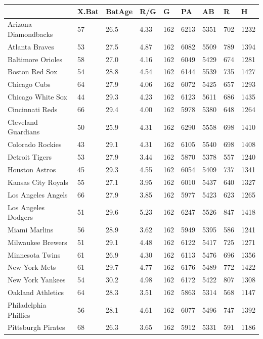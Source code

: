 \documentclass[
  11pt,
]{book}
\theoremstyle{definition}
\theoremstyle{definition}
\theoremstyle{definition}
\theoremstyle{definition}
\theoremstyle{remark}
\begin{document}
\begin{tabular}{lllllllll}
\toprule
  & X.Bat & BatAge & R/G & G & PA & AB & R & H\\
\midrule
Arizona Diamondbacks & 57 & 26.5 & 4.33 & 162 & 6213 & 5351 & 702 & 1232\\
Atlanta Braves & 53 & 27.5 & 4.87 & 162 & 6082 & 5509 & 789 & 1394\\
Baltimore Orioles & 58 & 27.0 & 4.16 & 162 & 6049 & 5429 & 674 & 1281\\
Boston Red Sox & 54 & 28.8 & 4.54 & 162 & 6144 & 5539 & 735 & 1427\\
Chicago Cubs & 64 & 27.9 & 4.06 & 162 & 6072 & 5425 & 657 & 1293\\
\addlinespace
Chicago White Sox & 44 & 29.3 & 4.23 & 162 & 6123 & 5611 & 686 & 1435\\
Cincinnati Reds & 66 & 29.4 & 4.00 & 162 & 5978 & 5380 & 648 & 1264\\
Cleveland Guardians & 50 & 25.9 & 4.31 & 162 & 6290 & 5558 & 698 & 1410\\
Colorado Rockies & 43 & 29.1 & 4.31 & 162 & 6105 & 5540 & 698 & 1408\\
Detroit Tigers & 53 & 27.9 & 3.44 & 162 & 5870 & 5378 & 557 & 1240\\
\addlinespace
Houston Astros & 45 & 29.3 & 4.55 & 162 & 6054 & 5409 & 737 & 1341\\
Kansas City Royals & 55 & 27.1 & 3.95 & 162 & 6010 & 5437 & 640 & 1327\\
Los Angeles Angels & 66 & 27.9 & 3.85 & 162 & 5977 & 5423 & 623 & 1265\\
Los Angeles Dodgers & 51 & 29.6 & 5.23 & 162 & 6247 & 5526 & 847 & 1418\\
Miami Marlins & 56 & 28.9 & 3.62 & 162 & 5949 & 5395 & 586 & 1241\\
\addlinespace
Milwaukee Brewers & 51 & 29.1 & 4.48 & 162 & 6122 & 5417 & 725 & 1271\\
Minnesota Twins & 61 & 26.9 & 4.30 & 162 & 6113 & 5476 & 696 & 1356\\
New York Mets & 61 & 29.7 & 4.77 & 162 & 6176 & 5489 & 772 & 1422\\
New York Yankees & 54 & 30.2 & 4.98 & 162 & 6172 & 5422 & 807 & 1308\\
Oakland Athletics & 64 & 28.3 & 3.51 & 162 & 5863 & 5314 & 568 & 1147\\
\addlinespace
Philadelphia Phillies & 56 & 28.1 & 4.61 & 162 & 6077 & 5496 & 747 & 1392\\
Pittsburgh Pirates & 68 & 26.3 & 3.65 & 162 & 5912 & 5331 & 591 & 1186\\

\end{tabular}
\end{document}

